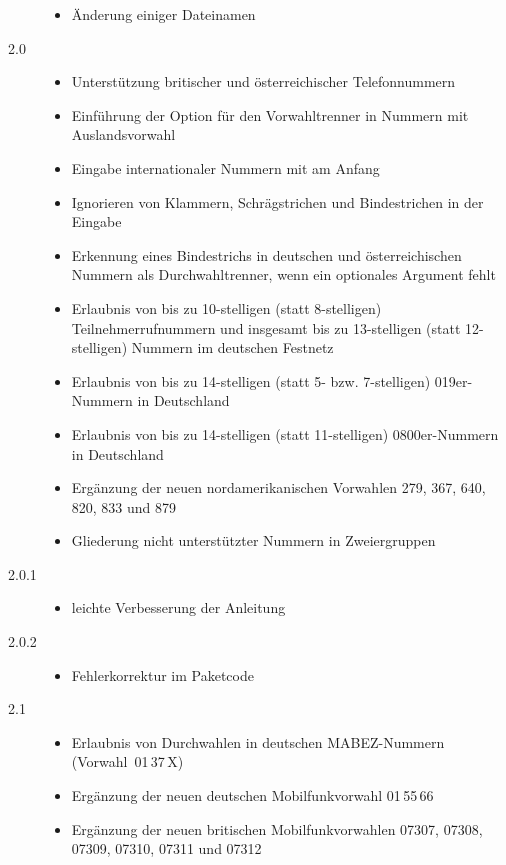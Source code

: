 \documentclass[numbers=noenddot]{scrreprt}
\begin{document}
\begin{description}
\begin{itemize}
\item Änderung einiger Dateinamen
\end{itemize}
\item[2.0] 
\begin{itemize}
\item Unterstützung britischer und österreichischer Telefonnummern
\item Einführung der Option
für den Vorwahltrenner in Nummern mit Auslandsvorwahl
\item Eingabe internationaler Nummern mit
am Anfang
\item Ignorieren von Klammern, Schrägstrichen und Bindestrichen in der Eingabe
\item Erkennung eines Bindestrichs in deutschen und österreichischen Nummern als Durchwahltrenner, wenn ein optionales Argument fehlt
\item Erlaubnis von bis zu 10-stelligen (statt 8-stelligen) Teilnehmerrufnummern und insgesamt bis zu 13-stelligen (statt 12-stelligen) Nummern im deutschen Festnetz
\item Erlaubnis von bis zu 14-stelligen (statt 5- bzw. 7-stelligen) 019er-Nummern in Deutschland
\item Erlaubnis von bis zu 14-stelligen (statt 11-stelligen) 0800er-Nummern in Deutschland
\item Ergänzung der neuen nordamerikanischen Vorwahlen 279, 367, 640, 820, 833 und 879
\item Gliederung nicht unterstützter Nummern in Zweiergruppen
\end{itemize}
\item[2.0.1] 
\begin{itemize}
\item leichte Verbesserung der Anleitung
\end{itemize}
\item[2.0.2] 
\begin{itemize}
\item Fehlerkorrektur im Paketcode
\end{itemize}
\item[2.1] 
\begin{itemize}
\item Erlaubnis von Durchwahlen in deutschen MABEZ-Nummern (Vorwahl~01\,37\,X)
\item Ergänzung der neuen deutschen Mobilfunkvorwahl 01\,55\,66
\item Ergänzung der neuen britischen Mobilfunkvorwahlen 07307, 07308, 07309, 07310, 07311 und 07312

\end{itemize}
\end{description}
\end{document}
